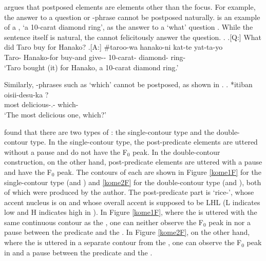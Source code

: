  argues that
postposed elements are elements other than the focus.
For example,
the answer to a question or -phrase cannot be postposed naturally.
\Next is an example of a , `a 10-carat diamond ring', as the answer to a `what' question .
While the sentence itself is natural,
the  cannot felicitously answer the question.
%
\ex.
 \a.[Q:] What did Taro buy for Hanako?
 \bg.[A:] \#taroo-wa hanako-ni kat-te yat-ta-yo    \\
 		Taro- Hanako-for buy-and give-- 10-carat- diamond- ring- \\
		`Taro bought (it) for Hanako, a 10-carat diamond ring.'

Similarly,
-phrases such as  `which' cannot be postposed, as shown in \Next.
\exg. *itiban oisii-desu-ka ? \\
		most delicious-.- which- \\
		`The most delicious one, which?'


 found that
there are two types of :
the single-contour type and the double-contour type.
In the single-contour type, the post-predicate elements are uttered without a pause and do not have the F$_{0}$ peak. In the double-contour construction, on the other hand, post-predicate elements are uttered with a pause and have the F$_{0}$ peak.
The  contours of each  are shown in Figure \ref{kome1F} for the single-contour type (\Next[A] and \NNext[A]) and \ref{kome2F} for the double-contour type (\Next[A$^{\prime}$] and \NNext[A$^{\prime}$]),
both of which were produced by the author.
The post-predicate part is  `rice-',
whose accent nucleus is on  and whose overall accent is supposed to be LHL (L indicates low and H indicates high in ).
In Figure \ref{kome1F}, where the  is uttered with the same continuous contour as the ,
one can neither observe the F$_{0}$ peak in  nor a pause between the predicate and the .
In Figure \ref{kome2F}, on the other hand,
where the  is uttered in a separate contour from the ,
one can observe the F$_{0}$ peak in  and a pause between the predicate and the .

